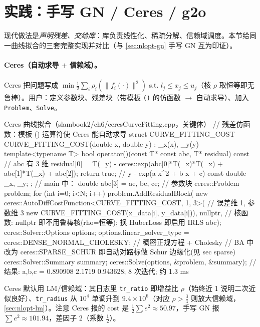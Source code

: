 \section{实践：手写 GN / Ceres / g2o}
\label{sec:nlopt-practice}

现代做法是\emph{声明残差、交给库}：库负责线性化、稀疏分解、信赖域调度。本节给同一曲线拟合的三套完整实现并对比（与 \cref{sec:nlopt-gn} 手写 GN 互为印证）。

\paragraph{Ceres（自动求导 $+$ 信赖域）。}\cite{gaoxiang2019slam14}
Ceres 把问题写成 $\min\tfrac12\sum_i\rho_i(\|f_i(\cdot)\|^2)$ s.t. $l_j\le x_j\le u_j$（核 $\rho$ 取恒等即无鲁棒）。用户：定义参数块、残差块（带模板 \texttt{()} 的仿函数 $\to$ 自动求导）、加入 \texttt{Problem}、\texttt{Solve}。

\begin{codebox}[C++]{Ceres 曲线拟合（slambook2/ch6/ceresCurveFitting.cpp，关键体）}
// 残差仿函数：模板 () 运算符使 Ceres 能自动求导
struct CURVE_FITTING_COST {
  CURVE_FITTING_COST(double x, double y) : _x(x), _y(y) {}
  template<typename T>
  bool operator()(const T* const abc, T* residual) const {  // abc 有 3 维
    residual[0] = T(_y) - ceres::exp(abc[0]*T(_x)*T(_x) + abc[1]*T(_x) + abc[2]);
    return true;                                             // y - exp(a x^2 + b x + c)
  }
  const double _x, _y;
};
// main 中：
double abc[3] = {ae, be, ce};                               // 参数块
ceres::Problem problem;
for (int i=0; i<N; i++)
  problem.AddResidualBlock(
    new ceres::AutoDiffCostFunction<CURVE_FITTING_COST, 1, 3>(  // 误差维 1, 参数维 3
      new CURVE_FITTING_COST(x_data[i], y_data[i])),
    nullptr,    // 核函数: nullptr 即不用鲁棒核(rho=恒等); 换 HuberLoss 即启用 IRLS
    abc);
ceres::Solver::Options options;
options.linear_solver_type = ceres::DENSE_NORMAL_CHOLESKY;  // 稠密正规方程 + Cholesky
// BA 中改为 ceres::SPARSE_SCHUR 即自动对路标做 Schur 边缘化(见 sec sparse)
ceres::Solver::Summary summary;
ceres::Solve(options, &problem, &summary);
// 结果: a,b,c = 0.890908 2.1719 0.943628; 8 次迭代; 约 1.3 ms
\end{codebox}

\noindent Ceres 默认用 LM/信赖域：其日志里 \texttt{tr\_ratio} 即增益比 $\rho$（始终近 1 说明二次近似良好）、\texttt{tr\_radius} 从 $10^4$ 单调升到 $9.4\times10^6$（对应 $\rho>\tfrac34$ 则放大信赖域，\cref{sec:nlopt-lm}）。注意 Ceres 报的 cost 是 $\tfrac12\sum e^2\approx50.97$，手写 GN 报 $\sum e^2\approx101.94$，差因子 2（系数 $\tfrac12$）。


